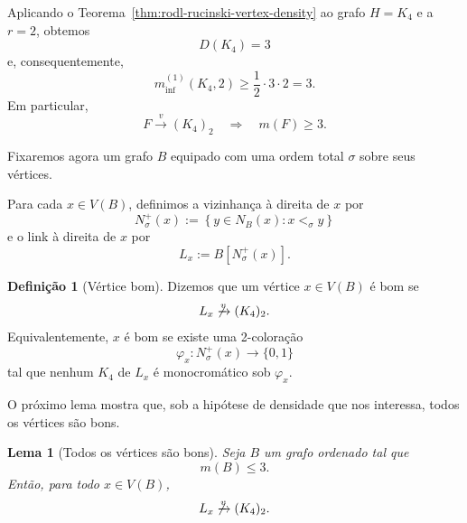 \documentclass[reqno, 12pt]{amsart}
\numberwithin{equation}{section}
\theoremstyle{plain}
\newtheorem{lemma}[theorem]{Lema}
\theoremstyle{definition}
\newtheorem{definition}[theorem]{Definição}
\begin{document}
Aplicando o Teorema~\ref{thm:rodl-rucinski-vertex-density}
ao grafo $H=K_4$ e a $r=2$, obtemos
\[
  D(K_4)=3
\]
e, consequentemente,
\[
  m_{\inf}^{(1)}(K_4,2)
  \geq
  \frac{1}{2}\cdot 3\cdot 2
  =
  3.
\]
Em particular,
\[
  F\xrightarrow{v}(K_4)_2
  \quad\Longrightarrow\quad
  m(F)\geq 3.
\]

Fixaremos agora um grafo $B$ equipado com uma ordem total
$\sigma$ sobre seus vértices.

Para cada $x\in V(B)$, definimos a vizinhança à direita de $x$ por
\[
  N_\sigma^+(x)
  :=
  \left\{
  y\in N_B(x):
  x<_\sigma y
  \right\}
\]
e o link à direita de $x$ por
\[
  L_x
  :=
  B[N_\sigma^+(x)].
\]

\begin{definition}[Vértice bom]
  \label{def:vertice-bom-link}
  Dizemos que um vértice $x\in V(B)$ é bom se
  \[
    L_x\not\xrightarrow{v}(K_4)_2.
  \]
  Equivalentemente, $x$ é bom se existe uma 2-coloração
  \[
    \varphi_x:
    N_\sigma^+(x)\longrightarrow\{0,1\}
  \]
  tal que nenhum $K_4$ de $L_x$ é monocromático sob $\varphi_x$.
\end{definition}

O próximo lema mostra que, sob a hipótese de densidade que nos
interessa, todos os vértices são bons.

\begin{lemma}[Todos os vértices são bons]
  \label{lem:todos-vertices-bons}
  Seja $B$ um grafo ordenado tal que
  \[
    m(B)\leq 3.
  \]
  Então, para todo $x\in V(B)$,
  \[
    L_x\not\xrightarrow{v}(K_4)_2.
  \]
\end{lemma}
\end{document}
